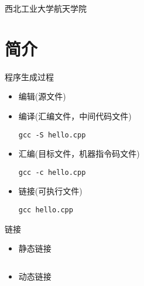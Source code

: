 

\def\lecturename{嵌入式技术}

\title{\insertlecture}

\author{邢超}

\institute
{
  西北工业大学航天学院
}


\subtitle{静态库与共享库}
\date{2015}



\begin{frame}
  \maketitle
\end{frame}


\section{简介}
\begin{frame}[containsverbatim]{程序生成过程}
\begin{itemize}
\item 编辑(源文件)
\item 编译(汇编文件，中间代码文件)
\lstset{language=c++}
\begin{lstlisting}
gcc -S hello.cpp
\end{lstlisting}
\item 汇编(目标文件，机器指令码文件)
\lstset{language=c++}
\begin{lstlisting}
gcc -c hello.cpp
\end{lstlisting}
\item 链接(可执行文件)
\lstset{language=c++}
\begin{lstlisting}
gcc hello.cpp
\end{lstlisting}
\end{itemize}
\end{frame}

\begin{frame}[containsverbatim]{链接}
\begin{itemize}
\item 静态链接
\lstset{language=c++}
\begin{lstlisting}
\end{lstlisting}
\item 动态链接
\lstset{language=c++}
\begin{lstlisting}
\end{lstlisting}
\end{itemize}
\end{frame}

